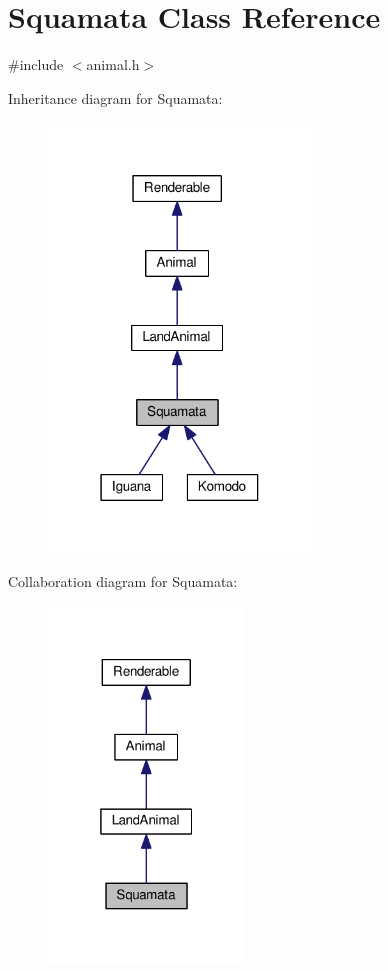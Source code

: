 \hypertarget{classSquamata}{}\section{Squamata Class Reference}
\label{classSquamata}


{\ttfamily \#include $<$animal.\+h$>$}



Inheritance diagram for Squamata\+:
\nopagebreak
\begin{figure}[H]
\begin{center}
\leavevmode
\includegraphics[width=198pt]{classSquamata__inherit__graph}
\end{center}
\end{figure}


Collaboration diagram for Squamata\+:
\nopagebreak
\begin{figure}[H]
\begin{center}
\leavevmode
\includegraphics[width=148pt]{classSquamata__coll__graph}
\end{center}
\end{figure}
